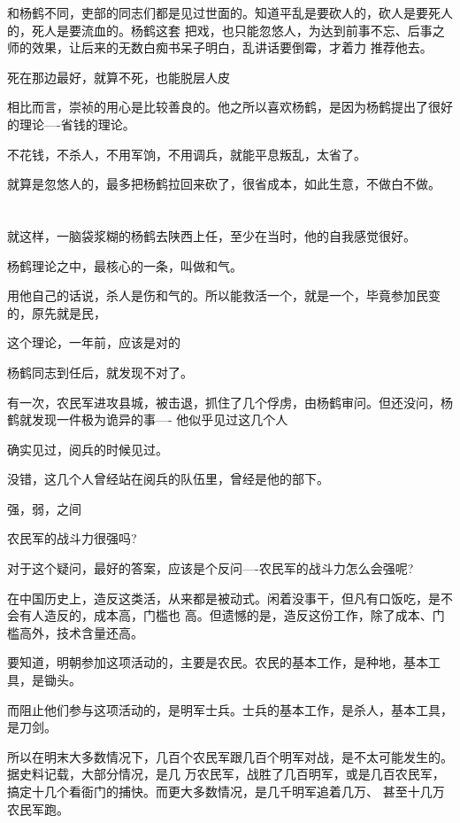 \documentclass[11pt,a4paper,onecolumn]{article}
\begin{document}
和杨鹤不同，吏部的同志们都是见过世面的。知道平乱是要砍人的，砍人是要死人的，死人是要流血的。杨鹤这套
把戏，也只能忽悠人，为达到前事不忘、后事之师的效果，让后来的无数白痴书呆子明白，乱讲话要倒霉，才着力
推荐他去。

死在那边最好，就算不死，也能脱层人皮

相比而言，崇祯的用心是比较善良的。他之所以喜欢杨鹤，是因为杨鹤提出了很好的理论----省钱的理论。

不花钱，不杀人，不用军饷，不用调兵，就能平息叛乱，太省了。

就算是忽悠人的，最多把杨鹤拉回来砍了，很省成本，如此生意，不做白不做。

\section[\thesection]{}

就这样，一脑袋浆糊的杨鹤去陕西上任，至少在当时，他的自我感觉很好。

杨鹤理论之中，最核心的一条，叫做和气。

用他自己的话说，杀人是伤和气的。所以能救活一个，就是一个，毕竟参加民变的，原先就是民，

这个理论，一年前，应该是对的

杨鹤同志到任后，就发现不对了。

有一次，农民军进攻县城，被击退，抓住了几个俘虏，由杨鹤审问。但还没问，杨鹤就发现一件极为诡异的事----
他似乎见过这几个人

确实见过，阅兵的时候见过。

没错，这几个人曾经站在阅兵的队伍里，曾经是他的部下。

强，弱，之间

农民军的战斗力很强吗?

对于这个疑问，最好的答案，应该是个反问----农民军的战斗力怎么会强呢?

在中国历史上，造反这类活，从来都是被动式。闲着没事干，但凡有口饭吃，是不会有人造反的，成本高，门槛也
高。但遗憾的是，造反这份工作，除了成本、门槛高外，技术含量还高。

要知道，明朝参加这项活动的，主要是农民。农民的基本工作，是种地，基本工具，是锄头。

而阻止他们参与这项活动的，是明军士兵。士兵的基本工作，是杀人，基本工具，是刀剑。

所以在明末大多数情况下，几百个农民军跟几百个明军对战，是不太可能发生的。据史料记载，大部分情况，是几
万农民军，战胜了几百明军，或是几百农民军，搞定十几个看衙门的捕快。而更大多数情况，是几千明军追着几万、
甚至十几万农民军跑。
\end{document}
